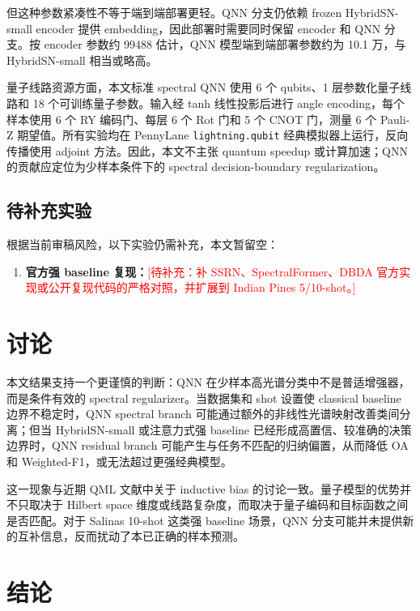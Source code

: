 \documentclass[UTF8,a4paper,zihao=-4,fontset=fandol]{ctexart}
\newcommand{\todo}[1]{\textcolor{red}{[待补充：#1]}}
\begin{document}
但这种参数紧凑性不等于端到端部署更轻。QNN 分支仍依赖 frozen HybridSN-small encoder 提供 embedding，因此部署时需要同时保留 encoder 和 QNN 分支。按 encoder 参数约 99488 估计，QNN 模型端到端部署参数约为 10.1 万，与 HybridSN-small 相当或略高。

量子线路资源方面，本文标准 spectral QNN 使用 6 个 qubits、1 层参数化量子线路和 18 个可训练量子参数。输入经 tanh 线性投影后进行 angle encoding，每个样本使用 6 个 RY 编码门、每层 6 个 Rot 门和 5 个 CNOT 门，测量 6 个 Pauli-Z 期望值。所有实验均在 PennyLane \texttt{lightning.qubit} 经典模拟器上运行，反向传播使用 adjoint 方法。因此，本文不主张 quantum speedup 或计算加速；QNN 的贡献应定位为少样本条件下的 spectral decision-boundary regularization。

\subsection{待补充实验}

根据当前审稿风险，以下实验仍需补充，本文暂留空：

\begin{enumerate}[label=(\arabic*)]
  \item \textbf{官方强 baseline 复现：}\todo{补 SSRN、SpectralFormer、DBDA 官方实现或公开复现代码的严格对照，并扩展到 Indian Pines 5/10-shot。}
\end{enumerate}

\section{讨论}

本文结果支持一个更谨慎的判断：QNN 在少样本高光谱分类中不是普适增强器，而是条件有效的 spectral regularizer。当数据集和 shot 设置使 classical baseline 边界不稳定时，QNN spectral branch 可能通过额外的非线性光谱映射改善类间分离；但当 HybridSN-small 或注意力式强 baseline 已经形成高置信、较准确的决策边界时，QNN residual branch 可能产生与任务不匹配的归纳偏置，从而降低 OA 和 Weighted-F1，或无法超过更强经典模型。

这一现象与近期 QML 文献中关于 inductive bias 的讨论一致。量子模型的优势并不只取决于 Hilbert space 维度或线路复杂度，而取决于量子编码和目标函数之间是否匹配。对于 Salinas 10-shot 这类强 baseline 场景，QNN 分支可能并未提供新的互补信息，反而扰动了本已正确的样本预测。

\section{结论}
\end{document}
